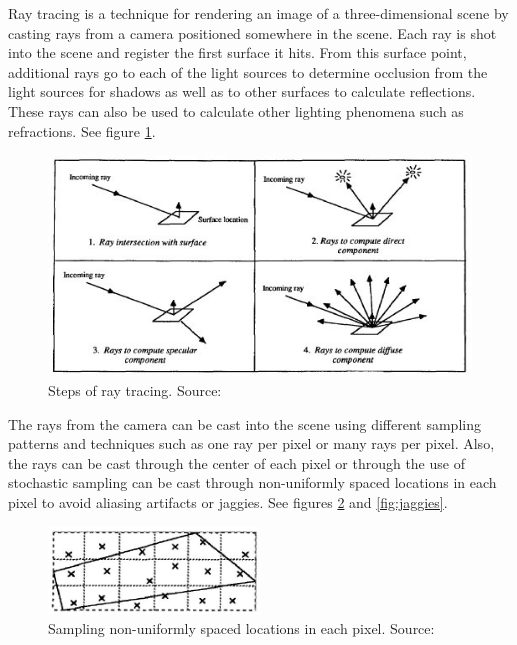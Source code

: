 Ray tracing is a technique for rendering an image of a three-dimensional scene by casting rays from a camera positioned somewhere in the scene.  Each ray is shot into the scene and register the first surface it hits.  From this surface point, additional rays go to each of the light sources to determine occlusion from the light sources for shadows as well as to other surfaces to calculate reflections.  These rays can also be used to calculate other lighting phenomena such as refractions.  See figure \ref{fig:raytraceCalc}.

\begin{figure}[h!]
  \centering
    \includegraphics[width=1.0\textwidth]{raytraceCalc.jpg}
  \caption{Steps of ray tracing. Source: \protect\cite{Ward1988}}
	\label{fig:raytraceCalc}
\end{figure}

The rays from the camera can be cast into the scene using different sampling patterns and techniques such as one ray per pixel or many rays per pixel.  Also, the rays can be cast through the center of each pixel or through the use of stochastic sampling can be cast through non-uniformly spaced locations in each pixel to avoid aliasing artifacts or jaggies. See figures \ref{fig:sampling} and \ref{fig:jaggies}.

\begin{figure}[h!]
  \centering
    \includegraphics[width=0.5\textwidth]{sampling.jpg}
  \caption{Sampling non-uniformly spaced locations in each pixel. Source: \protect\cite{Reeves1987}}
	\label{fig:sampling}
\end{figure}

